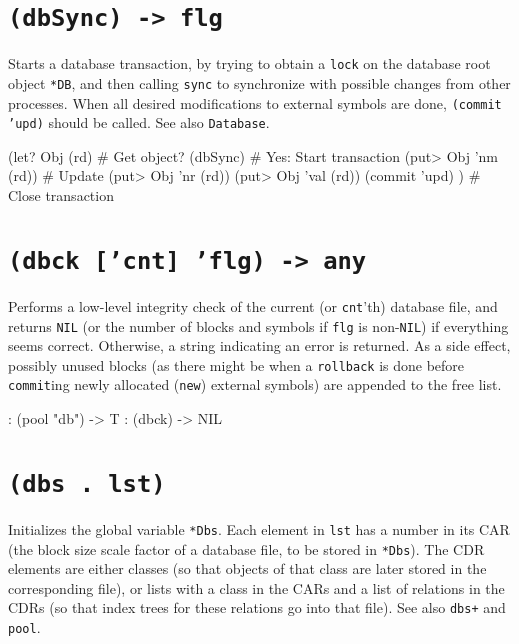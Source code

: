  
\section*{\texttt{(dbSync) -> flg}}
\label{sec:func-ref-D-(dbSync) -> flg}


Starts a database transaction, by trying to obtain a \texttt{lock} on the
database root object \texttt{*DB}, and then calling \texttt{sync} to synchronize with
possible changes from other processes. When all desired modifications to
external symbols are done, \texttt{(commit 'upd)} should be called. See also
\texttt{Database}.


\begin{wideverbatim}
(let? Obj (rd)             # Get object?
   (dbSync)                # Yes: Start transaction
   (put> Obj 'nm (rd))     # Update
   (put> Obj 'nr (rd))
   (put> Obj 'val (rd))
   (commit 'upd) )         # Close transaction
\end{wideverbatim}

 
\section*{\texttt{(dbck ['cnt] 'flg) -> any}}
\label{sec:func-ref-D-(dbck ['cnt] 'flg) -> any}


Performs a low-level integrity check of the current (or \texttt{cnt}'th)
database file, and returns \texttt{NIL} (or the number of blocks and symbols if
\texttt{flg} is non-\texttt{NIL}) if everything seems correct. Otherwise, a string
indicating an error is returned. As a side effect, possibly unused
blocks (as there might be when a \texttt{rollback} is done before \texttt{commit}ing newly allocated (\texttt{new}) external symbols) are appended to the free list.


\begin{wideverbatim}
: (pool "db")
-> T
: (dbck)
-> NIL
\end{wideverbatim}

 
\section*{\texttt{(dbs . lst)}}
\label{sec:func-ref-D-(dbs . lst)}


Initializes the global variable \texttt{*Dbs}. Each element in \texttt{lst} has a
number in its CAR (the block size scale factor of a database file, to be
stored in \texttt{*Dbs}). The CDR elements are either classes (so that objects
of that class are later stored in the corresponding file), or lists with
a class in the CARs and a list of relations in the CDRs (so that index
trees for these relations go into that file). See also \texttt{dbs+} and
\texttt{pool}.


